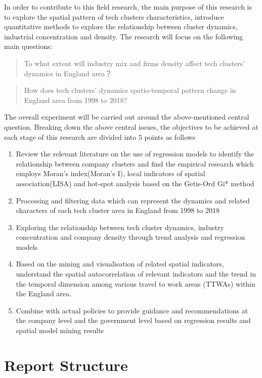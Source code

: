 \documentclass[
  12pt,
  oneside]{book}
\begin{document}
In order to contribute to this field research, the main purpose of this research is to explore the spatial pattern of tech clusters characteristics, introduce quantitative methods to explore the relationship between cluster dynamics, industrial concentration and density. The research will focus on the following main questions:

\begin{quote}
To what extent will industry mix and firms density affect tech clusters' dynamics in England area？
\end{quote}

\begin{quote}
How does tech clusters' dynamics spatio-temporal pattern change in England area from 1998 to 2018?
\end{quote}

The overall experiment will be carried out around the above-mentioned central question. Breaking down the above central issues, the objectives to be achieved at each stage of this research are divided into 5 points as follows

\begin{enumerate}
\def\labelenumi{\arabic{enumi}.}
\item
  Review the relevant literature on the use of regression models to identify the relationship between company clusters and find the empirical research which employs Moran's index(Moran's I), local indicators of spatial association(LISA) and hot-spot analysis based on the Getis-Ord Gi* method
\item
  Processing and filtering data which can represent the dynamics and related characters of each tech cluster area in England from 1998 to 2018
\item
  Exploring the relationship between tech cluster dynamics, industry concentration and company density through trend analysis and regression models
\item
  Based on the mining and visualisation of related spatial indicators, understand the spatial autocorrelation of relevant indicators and the trend in the temporal dimension among various travel to work areas (TTWAs) within the England area.
\item
  Combine with actual policies to provide guidance and recommendations at the company level and the government level based on regression results and spatial model mining results
\end{enumerate}

\hypertarget{report-structure}{%
\section{Report Structure}\label{report-structure}}
\end{document}
